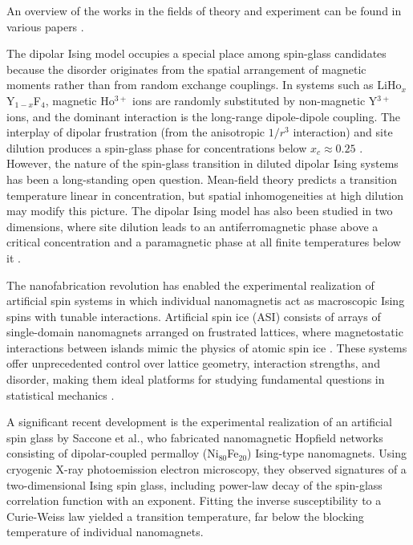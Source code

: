 \documentclass[
    aps,
    prb,
    reprint,           %
    superscriptaddress,%
    amsmath,amssymb,
    floatfix
]{revtex4-2}
\begin{document}
An overview of the works in the fields of theory and experiment can be found in various papers \cite{Binder1986, Parisi1987, Dahlberg2025, SK2025}.

The dipolar Ising model occupies a special place among spin-glass candidates because the disorder originates from the spatial arrangement of magnetic moments rather than from random exchange couplings. In systems such as LiHo$_x$Y$_{1-x}$F$_4$, magnetic Ho$^{3+}$ ions are randomly substituted by non-magnetic Y$^{3+}$ ions, and the dominant interaction is the long-range dipole-dipole coupling. The interplay of dipolar frustration (from the anisotropic $1/r^3$ interaction) and site dilution produces a spin-glass phase for concentrations below $x_c \approx 0.25$ \cite{Reich1990}. However, the nature of the spin-glass transition in diluted dipolar Ising systems has been a long-standing open question. Mean-field theory predicts a transition temperature linear in concentration, but spatial inhomogeneities at high dilution may modify this picture. The dipolar Ising model has also been studied in two dimensions, where site dilution leads to an antiferromagnetic phase above a critical concentration and a paramagnetic phase at all finite temperatures below it \cite{Alonso2010}. 

The nanofabrication revolution has enabled the experimental realization of artificial spin systems in which individual nanomagnetis act as macroscopic Ising spins with tunable interactions. Artificial spin ice (ASI) consists of arrays of single-domain nanomagnets arranged on frustrated lattices, where magnetostatic interactions between islands mimic the physics of atomic spin ice \cite{Morley2017}. These systems offer unprecedented control over lattice geometry, interaction strengths, and disorder, making them ideal platforms for studying fundamental questions in statistical mechanics \cite{Levis2013}.

A significant recent development is the experimental realization of an artificial spin glass by Saccone et al.\cite{Saccone2022}, who fabricated nanomagnetic Hopfield networks consisting of dipolar-coupled permalloy (Ni$_{80}$Fe$_{20}$) Ising-type nanomagnets. Using cryogenic X-ray photoemission electron microscopy, they observed signatures of a two-dimensional Ising spin glass, including power-law decay of the spin-glass correlation function with an exponent. Fitting the inverse susceptibility to a Curie-Weiss law yielded a transition temperature, far below the blocking temperature of individual nanomagnets.
\end{document}
